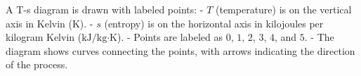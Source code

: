 A T-s diagram is drawn with labeled points:  
- \( T \) (temperature) is on the vertical axis in Kelvin (K).  
- \( s \) (entropy) is on the horizontal axis in kilojoules per kilogram Kelvin (\( \text{kJ/kg·K} \)).  
- Points are labeled as \( 0 \), \( 1 \), \( 2 \), \( 3 \), \( 4 \), and \( 5 \).  
- The diagram shows curves connecting the points, with arrows indicating the direction of the process.